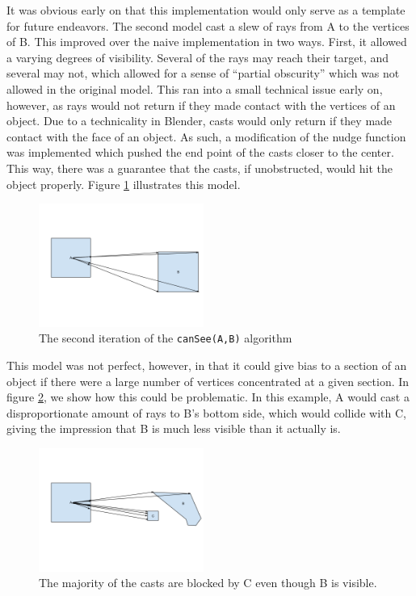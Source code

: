 It was obvious early on that this implementation would only serve as a template for future endeavors.
The second model cast a slew of rays from A to the vertices of B. This improved over the naive implementation in two ways. First, it allowed a varying degrees of visibility. Several of the rays may reach their target, and several may not, which allowed for a sense of “partial obscurity” which was not allowed in the original model. This ran into a small technical issue early on, however, as rays would not return if they made contact with the vertices of an object. Due to a technicality in Blender, casts would only return if they made contact with the face of an object. As such, a modification of the nudge function was implemented which pushed the end point of the casts closer to the center. This way, there was a guarantee that the casts, if unobstructed, would hit the object properly. Figure \ref{fig:vision5} illustrates this model.

\begin{figure}[h]
	\begin{center}
		\includegraphics[width=0.48\textwidth]{figures/vision5.png}
	\end{center}
	\caption{The second iteration of the \texttt{canSee(A,B)} algorithm}
	\label{fig:vision5}
\end{figure}

This model was not perfect, however, in that it could give bias to a section of an object if there were a large number of vertices concentrated at a given section. In figure \ref{fig:vision6}, we show how this could be problematic. In this example, A would cast a disproportionate amount of rays to B's bottom side, which would collide with C, giving the impression that B is much less visible than it actually is.

\begin{figure}[h]
	\begin{center}
		\includegraphics[width=0.48\textwidth]{figures/vision6.png}
	\end{center}
	\caption{The majority of the casts are blocked by C even though B is visible.}
	\label{fig:vision6}
\end{figure}

